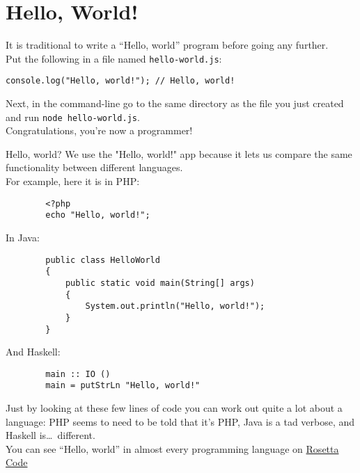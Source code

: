 \section{Hello, World!}

It is traditional to write a ``Hello, world'' program before going any further.
\\

Put the following in a file named \texttt{hello-world.js}:

\begin{verbatim}
console.log("Hello, world!"); // Hello, world!
\end{verbatim}

Next, in the command-line go to the same directory as the file you just created and run \texttt{node hello-world.js}.
\\

Congratulations, you're now a programmer!

\newpage

\begin{infobox}{Hello, world?}
    We use the "Hello, world!" app because it lets us compare the same functionality between different languages.
    \\

    For example, here it is in PHP:

    \begin{verbatim}
        <?php
        echo "Hello, world!";
    \end{verbatim}

    In Java:

    \begin{verbatim}
        public class HelloWorld
        {
            public static void main(String[] args)
            {
                System.out.println("Hello, world!");
            }
        }
    \end{verbatim}

    And Haskell:

    \begin{verbatim}
        main :: IO ()
        main = putStrLn "Hello, world!"
    \end{verbatim}

    Just by looking at these few lines of code you can work out quite a lot about a language: PHP seems to need to be told that it's PHP, Java is a tad verbose, and Haskell is\ldots\ different.
    \\

    You can see ``Hello, world'' in almost every programming language on \href{https://rosettacode.org/wiki/Hello_world/Text}{Rosetta Code}
\end{infobox}


